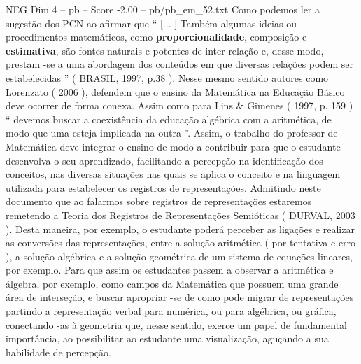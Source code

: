 \begin{textsample}{NEG Dim 4 – pb – Score -2.00 – pb/pb\_em\_52.txt}
Como podemos ler a sugestão dos PCN ao afirmar que “ [... ] Também algumas ideias ou procedimentos matemáticos, como \textbf{proporcionalidade}, composição e \textbf{estimativa}, são fontes naturais e potentes de inter-relação e, desse modo, prestam -se a uma abordagem dos conteúdos em que diversas relações podem ser estabelecidas ” ( BRASIL, 1997, p.38 ).
Nesse mesmo sentido autores como Lorenzato ( 2006 ), defendem que o ensino da Matemática na Educação Básico deve ocorrer de forma conexa.
Assim como para Lins \& Gimenes ( 1997, p. 159 ) “ devemos buscar a coexistência da educação algébrica com a aritmética, de modo que uma esteja implicada na outra ”.
Assim, o trabalho do professor de Matemática deve integrar o ensino de modo a contribuir para que o estudante desenvolva o seu aprendizado, facilitando a percepção na identificação dos conceitos, nas diversas situações nas quais se aplica o conceito e na linguagem utilizada para estabelecer os registros de representações.
Admitindo neste documento que ao falarmos sobre registros de representações estaremos remetendo a Teoria dos Registros de Representações Semióticas ( DURVAL, 2003 ).
Desta maneira, por exemplo, o estudante poderá perceber as ligações e realizar as conversões das representações, entre a solução aritmética ( por tentativa e erro ), a solução algébrica e a solução geométrica de um sistema de equações lineares, por exemplo.
Para que assim os estudantes passem a observar a aritmética e álgebra, por exemplo, como campos da Matemática que possuem uma grande área de interseção, e buscar apropriar -se de como pode migrar de representações partindo a representação verbal para numérica, ou para algébrica, ou gráfica, conectando -as à geometria que, nesse sentido, exerce um papel de fundamental importância, ao possibilitar ao estudante uma visualização, aguçando a sua habilidade de percepção.

\end{textsample}
